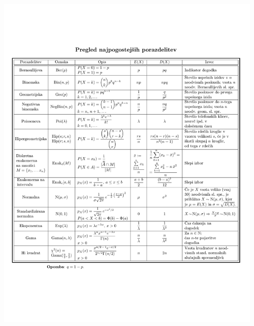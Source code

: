 \documentclass[a3paper,8pt]{extarticle}
\begin{document}
\begin{multicols}{4}
\includegraphics[page=1, scale=0.99]{Porazd.pdf}
\end{multicols}
\end{document}
